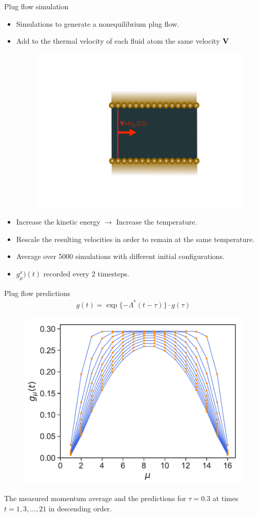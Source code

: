 \documentclass{beamer}
\newcommand{\esc}{\!\cdot\!}
\begin{document}
\begin{frame}{Plug flow simulation}
  \begin{itemize}
    \item Simulations to generate a nonequilibrium plug flow. 
    \item Add to the thermal velocity of each fluid atom the same velocity $\bf{V}$ 
\begin{figure}[]
  \includegraphics[width=0.3\linewidth]{plug_flow}
\end{figure}
\item Increase the kinetic energy $\rightarrow$ Increase the temperature. 
\item Rescale the resulting velocities in order to remain at the same temperature. 
\item Average over 5000 simulations with different initial configurations.
\item $g^x_{\mu})(t)$ recorded every 2 timesteps.  
  \end{itemize}
\end{frame}

\begin{frame}{Plug flow predictions}
  \begin{align}
    g(t)=\exp\{-\Lambda^* (t-\tau)\}\esc g(\tau)
    \nonumber
\end{align}
\begin{figure}[!h]
\includegraphics[width=0.5\linewidth]{gxtPredictions-17nodes-WALLS-defense1}
\end{figure}
The {\color{blue} measured momentum average} and the {\color{orange} predictions} for $\tau=0.3$ at times $t=1,3,...,21$ in descending order. 
\end{frame}
\end{document}
